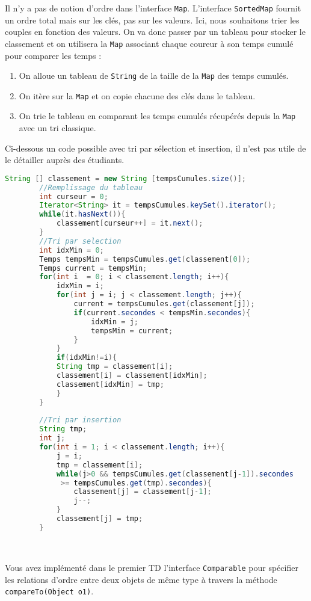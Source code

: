 \documentclass[iutinfo,a4paper,nocorrections,10pt]{ustl-tdtp}
\begin{document}
\begin{correction}
{\color{red}
Il n'y a pas de notion d'ordre dans l'interface \texttt{Map}. L'interface \texttt{SortedMap} fournit un ordre total mais sur les clés, pas sur les valeurs. Ici, nous souhaitons trier les couples en fonction des valeurs. On va donc passer par un tableau pour stocker le classement et on utilisera la \texttt{Map} associant chaque coureur à son temps cumulé pour comparer les temps : 

\begin{enumerate}
\item On alloue un tableau de \texttt{String} de la taille de la \texttt{Map} des temps cumulés.
\item On itère sur la \texttt{Map} et on copie chacune des clés dans le tableau.
\item On trie le tableau en comparant les temps cumulés récupérés depuis la \texttt{Map} avec un tri classique.

\end{enumerate}
Ci-dessous un code possible avec tri par sélection et insertion, il n'est pas utile de le détailler auprès des étudiants.
\begin{lstlisting}[language=Java]
String [] classement = new String [tempsCumules.size()];
		//Remplissage du tableau
		int curseur = 0;
		Iterator<String> it = tempsCumules.keySet().iterator();
		while(it.hasNext()){
			classement[curseur++] = it.next();
		}
		//Tri par selection
		int idxMin = 0;
		Temps tempsMin = tempsCumules.get(classement[0]);
		Temps current = tempsMin;
		for(int i  = 0; i < classement.length; i++){
			idxMin = i;
			for(int j = i; j < classement.length; j++){
				current = tempsCumules.get(classement[j]);
				if(current.secondes < tempsMin.secondes){
					idxMin = j;
					tempsMin = current;
				}
			}
			if(idxMin!=i){
			String tmp = classement[i];
			classement[i] = classement[idxMin];
			classement[idxMin] = tmp;
			}
		}
		
		//Tri par insertion
		String tmp;
		int j;
		for(int i = 1; i < classement.length; i++){
			j = i;
			tmp = classement[i];
			while(j>0 && tempsCumules.get(classement[j-1]).secondes
			 >= tempsCumules.get(tmp).secondes){
				classement[j] = classement[j-1];
				j--;
			}
			classement[j] = tmp;
		}
		
		
\end{lstlisting}
}
\end{correction}

\paragraph{}Vous avez implémenté dans le premier TD l'interface \texttt{Comparable} pour spécifier les relations d'ordre entre deux objets de même type à travers la méthode \texttt{compareTo(Object o1)}.
\end{document}
